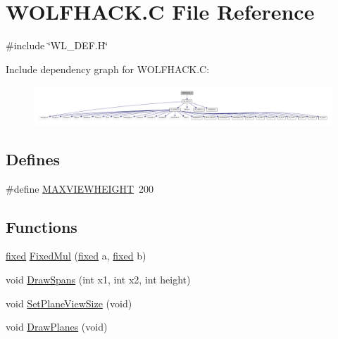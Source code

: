 \hypertarget{WOLFHACK_8C}{
\section{WOLFHACK.C File Reference}
\label{WOLFHACK_8C}
}
{\ttfamily \#include \char`\"{}WL\_\-DEF.H\char`\"{}}\par
Include dependency graph for WOLFHACK.C:
\nopagebreak
\begin{figure}[H]
\begin{center}
\leavevmode
\includegraphics[width=400pt]{WOLFHACK_8C__incl}
\end{center}
\end{figure}
\subsection*{Defines}
\begin{DoxyCompactItemize}
\item 
\#define \hyperlink{WOLFHACK_8C_ad87c27b3116bdb01a5163f8c4c3923aa}{MAXVIEWHEIGHT}~200
\end{DoxyCompactItemize}
\subsection*{Functions}
\begin{DoxyCompactItemize}
\item 
\hyperlink{WL__DEF_8H_aaf54715c9b83afe8794059fcf5fd5e7e}{fixed} \hyperlink{WOLFHACK_8C_abfc050cf3ca8d5863a10f7a95b87b9f2}{FixedMul} (\hyperlink{WL__DEF_8H_aaf54715c9b83afe8794059fcf5fd5e7e}{fixed} a, \hyperlink{WL__DEF_8H_aaf54715c9b83afe8794059fcf5fd5e7e}{fixed} b)
\item 
void \hyperlink{WOLFHACK_8C_a74fe032af0daeb2b94e5313e32ee378c}{DrawSpans} (int x1, int x2, int height)
\item 
void \hyperlink{WOLFHACK_8C_a522f0e08c31d2c568ff188e825cfe9c4}{SetPlaneViewSize} (void)
\item 
void \hyperlink{WOLFHACK_8C_a6ad59c546e9b7bad6c682670b884ba1e}{DrawPlanes} (void)
\end{DoxyCompactItemize}
